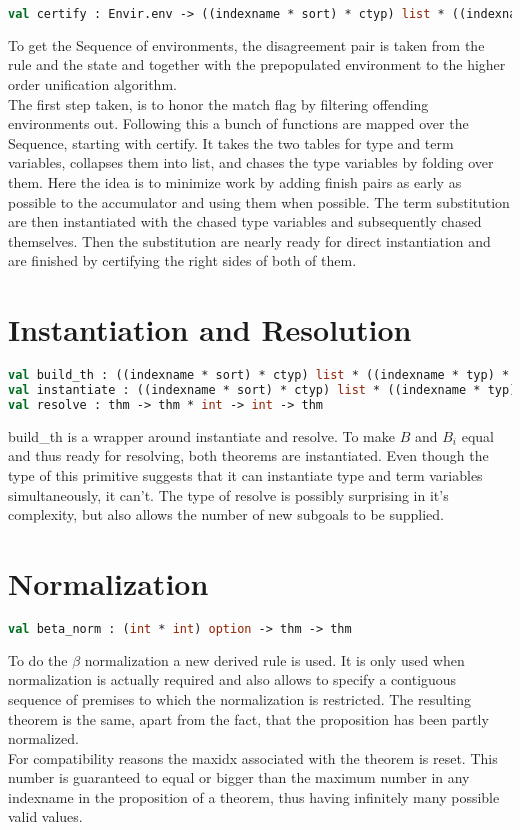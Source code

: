 \begin{lstlisting}[language=ML,breaklines=true]
val certify : Envir.env -> ((indexname * sort) * ctyp) list * ((indexname * typ) * cterm) list
\end{lstlisting}

To get the Sequence of environments, the disagreement pair is taken from the rule and the state and together with the prepopulated environment to the higher order unification algorithm.\\
The first step taken, is to honor the match flag by filtering offending environments out. Following this a bunch of functions are mapped over the Sequence, starting with certify. It takes the two tables for type and term variables, collapses them into list, and chases the type variables by folding over them. Here the idea is to minimize work by adding finish pairs as early as possible to the accumulator and using them when possible. The term substitution are then instantiated with the chased type variables and subsequently chased themselves. Then the substitution are nearly ready for direct instantiation and are finished by certifying the right sides of both of them.

\section{Instantiation and Resolution}

\begin{lstlisting}[language=ML,breaklines=true]
val build_th : ((indexname * sort) * ctyp) list * ((indexname * typ) * cterm) list -> thm
val instantiate : ((indexname * sort) * ctyp) list * ((indexname * typ) * cterm) list
val resolve : thm -> thm * int -> int -> thm
\end{lstlisting}

build\_th is a wrapper around instantiate and resolve. To make $B$ and $B_i$ equal and thus ready for resolving, both theorems are instantiated. Even though the type of this primitive suggests that it can instantiate type and term variables simultaneously, it can't. The type of resolve is possibly surprising in it's complexity, but also allows the number of new subgoals to be supplied.

\section{Normalization}

\begin{lstlisting}[language=ML,breaklines=true]
val beta_norm : (int * int) option -> thm -> thm
\end{lstlisting}

To do the $\beta$ normalization a new derived rule is used. It is only used when normalization is actually required and also allows to specify a contiguous sequence of premises to which the normalization is restricted. The resulting theorem is the same, apart from the fact, that the proposition has been partly normalized.\\
For compatibility reasons the maxidx associated with the theorem is reset. This number is guaranteed to equal or bigger than the maximum number in any indexname in the proposition of a theorem, thus having infinitely many possible valid values.